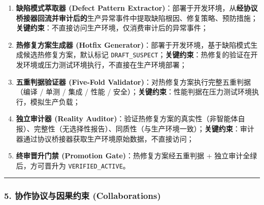 \begin{enumerate}
\def\labelenumi{\arabic{enumi}.}
\item
  \textbf{缺陷模式萃取器 (Defect Pattern
  Extractor)}：部署于开发环境，从\textbf{经协议桥接器回流并审计后的}生产异常事件中提取缺陷根因、修复策略、预防措施；\textbf{关键约束}：不直接访问生产环境，仅消费审计后的异常事件；
\item
  \textbf{热修复方案生成器 (Hotfix
  Generator)}：部署于开发环境，基于缺陷模式生成候选热修复方案，默认标记
  \texttt{DRAFT\_SUSPECT}；\textbf{关键约束}：热修复的验证在开发环境或压力测试环境执行，不直接在生产环境部署；
\item
  \textbf{五重判据验证器 (Five-Fold
  Validator)}：对热修复方案执行完整五重判据（编译 / 单测 / 集成 / 性能 /
  安全）；\textbf{关键约束}：性能判据在压力测试环境执行，模拟生产负载；
\item
  \textbf{独立审计器 (Reality
  Auditor)}：验证热修复方案的真实性（非智能体自报）、完整性（无选择性报告）、同质性（与生产环境一致）；\textbf{关键约束}：审计器通过协议桥接器获取生产环境原始数据，不直接访问；
\item
  \textbf{终审晋升门禁 (Promotion Gate)}：热修复方案经五重判据 +
  独立审计全绿后，方可晋升为 \texttt{VERIFIED\_ACTIVE}。
\end{enumerate}

\begin{center}\rule{0.5\linewidth}{0.5pt}\end{center}

\subsubsection{5. 协作协议与因果约束
(Collaborations)}\label{ux534fux4f5cux534fux8baeux4e0eux56e0ux679cux7ea6ux675f-collaborations-20}

